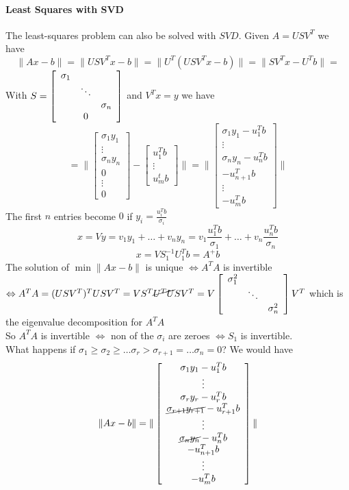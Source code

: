 \documentclass[10pt]{report}
\begin{document}
\paragraph{Least Squares with SVD}
The least-squares problem can also be solved with $SVD$. Given $A=USV^T$ we have $$\|Ax-b\| = \|USV^Tx-b\| = \|U^T(USV^Tx - b)\| = \|SV^Tx-U^Tb\| =$$
With $S =\left[\begin{array}{c c c}
\sigma_1\\
& \ddots\\
& & \sigma_n\\
& 0
\end{array}\right]$ and $V^Tx = y$ we have
$$=\|\left[\begin{array}{c}
\sigma_1y_1\\\vdots\\\sigma_ny_n\\0\\\vdots\\0
\end{array}\right] - \left[\begin{array}{c}
u_1^Tb\\\vdots\\u_m^tb
\end{array}\right] \| = \|\left[\begin{array}{c}
\sigma_1y_1-u_1^Tb\\\vdots\\\sigma_ny_n-u_n^Tb\\-u_{n+1}^Tb\\\vdots\\-u_m^Tb
\end{array}\right]\|$$
The first $n$ entries become $0$ if $y_i = \frac{u_i^Tb}{\sigma_i}$\\
$$x = Vy = v_1y_1 + \ldots + v_ny_n = v_1\frac{u_1^Tb}{\sigma_1} + \ldots + v_n\frac{u_n^Tb}{\sigma_n}$$
$$x = VS_1^{-1}U_1^Tb = A^+b$$
The solution of $\min \|Ax-b\|$ is unique $\Leftrightarrow A^TA$ is invertible $\Leftrightarrow A^TA=(USV^T)^TUSV^T = VS^T\cancel{U^TU}SV^T = V\left[\begin{array}{c c c}
\sigma_1^2\\
& \ddots\\
& & \sigma_n^2
\end{array}\right]V^T$ which is the eigenvalue decomposition for $A^TA$\\
So $A^TA$ is invertible $\Leftrightarrow$ non of the $\sigma_i$ are zeroes $\Leftrightarrow S_1$ is invertible.\\
What happens if $\sigma_1\geq \sigma_2 \geq \ldots \sigma_r > \sigma_{r+1} = \ldots \sigma_n = 0$? We would have $$\|Ax-b\|=\|\left[\begin{array}{c}
\sigma_1y_1-u_1^Tb\\\vdots\\\sigma_ry_r-u_r^Tb\\\cancel{\sigma_{r+1}y_{r+1}}-u_{r+1}^Tb\\\vdots\\\cancel{\sigma_ny_n}-u_n^Tb\\-u_{n+1}^Tb\\\vdots\\-u_m^Tb
\end{array}\right]\|$$
\end{document}
